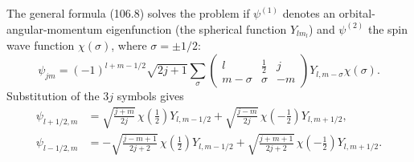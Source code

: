 \SolutionHeading The general formula (106.8) solves the problem if $\psi^{(1)}$ denotes an orbital-angular-momentum eigenfunction (the spherical function $Y_{lm_l}$) and $\psi^{(2)}$ the spin wave function $\chi(\sigma)$, where $\sigma=\pm1/2$:
\[
 \psi_{jm}=(-1)^{l+m-1/2}\sqrt{2j+1}\sum_\sigma
 \begin{pmatrix}l&\frac12&j\\m-\sigma&\sigma&-m\end{pmatrix}Y_{l,m-\sigma}\chi(\sigma).
\]
Substitution of the $3j$ symbols gives
\begin{align*}
 \psi_{l+1/2,m}&=\sqrt{\frac{j+m}{2j}}\,\chi\!\left(\frac12\right)Y_{l,m-1/2}
 +\sqrt{\frac{j-m}{2j}}\,\chi\!\left(-\frac12\right)Y_{l,m+1/2},\\
 \psi_{l-1/2,m}&=-\sqrt{\frac{j-m+1}{2j+2}}\,\chi\!\left(\frac12\right)Y_{l,m-1/2}
 +\sqrt{\frac{j+m+1}{2j+2}}\,\chi\!\left(-\frac12\right)Y_{l,m+1/2}.
\end{align*}

